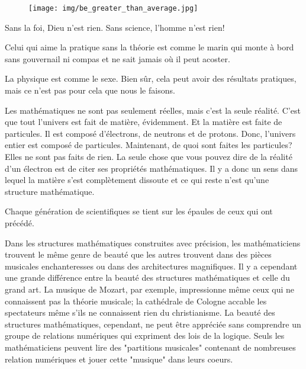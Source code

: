 	\begin{figure}[H]
		\centering
		\texttt{[image: img/be\_greater\_than\_average.jpg]}	
	\end{figure}
	\begin{fquote}Sans la foi, Dieu n'est rien. Sans science, l'homme n'est rien!
 	\end{fquote}
 	
	\begin{fquote}Celui qui aime la pratique sans la théorie est comme le marin qui monte à bord sans gouvernail ni compas et ne sait jamais où il peut acoster.
 	\end{fquote}
 	
	\begin{fquote}La physique est comme le sexe. Bien sûr, cela peut avoir des résultats pratiques, mais ce n’est pas pour cela que nous le faisons.
 	\end{fquote}
 	
	\begin{fquote}Les mathématiques ne sont pas seulement réelles, mais c'est la seule réalité. C'est que tout l'univers est fait de matière, évidemment. Et la matière est faite de particules. Il est composé d'électrons, de neutrons et de protons. Donc, l'univers entier est composé de particules. Maintenant, de quoi sont faites les particules? Elles ne sont pas faits de rien. La seule chose que vous pouvez dire de la réalité d'un électron est de citer ses propriétés mathématiques. Il y a donc un sens dans lequel la matière s'est complètement dissoute et ce qui reste n'est qu'une structure mathématique.
 	\end{fquote}
 	
 	\begin{fquote}Chaque génération de scientifiques se tient sur les épaules de ceux qui ont précédé.
 	\end{fquote}
 	
 	\begin{fquote}Dans les structures mathématiques construites avec précision, les mathématiciens trouvent le même genre de beauté que les autres trouvent dans des pièces musicales enchanteresses ou dans des architectures magnifiques. Il y a cependant une grande différence entre la beauté des structures mathématiques et celle du grand art. La musique de Mozart, par exemple, impressionne même ceux qui ne connaissent pas la théorie musicale; la cathédrale de Cologne accable les spectateurs même s'ils ne connaissent rien du christianisme. La beauté des structures mathématiques, cependant, ne peut être appréciée sans comprendre un groupe de relations numériques qui expriment des lois de la logique. Seuls les mathématiciens peuvent lire des "partitions musicales" contenant de nombreuses relation numériques et jouer cette "musique" dans leurs coeurs.
 	\end{fquote}
 	
